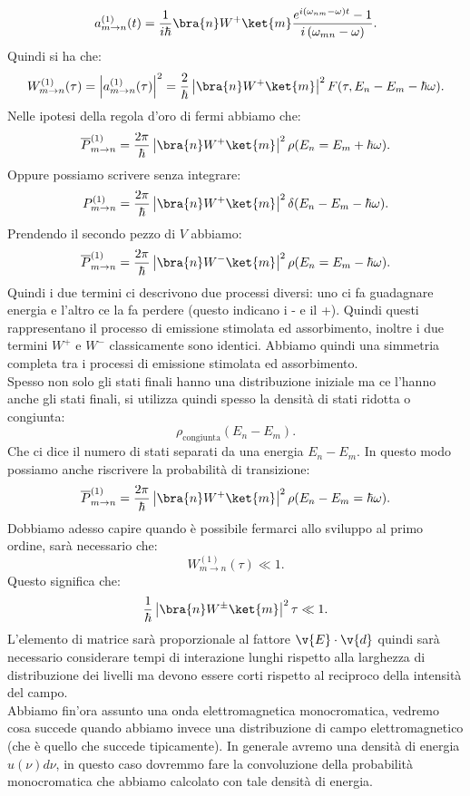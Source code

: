 \[
    a_{m\to n}^{(1)}(t) =
    \frac{1}{i\hbar }\bra{n}W^+ \ket{m} \frac{e^{i(\omega_{nm}-\omega )t}-1}{i\left( \omega_{mn}-\omega\right)}
.\] 
Quindi si ha che:
\[
    W^{(1) }_{m\to n}(\tau) =
    \left|a^{(1)}_{m\to n}(\tau) \right|^2 =
    \frac{2}{\hbar }\left|\bra{n}W^+ \ket{m}\right|^2 F(\tau,E_n-E_m - \hbar \omega) 
.\] 
Nelle ipotesi della regola d'oro di fermi abbiamo che:
\[
    \overline{P}^{(1)}_{m\to n} = \frac{2\pi}{\hbar }\left|\bra{n}W^+ \ket{m}\right|^2\rho(E_n=E_m+\hbar \omega) 
.\] 
Oppure possiamo scrivere senza integrare:
\[
    P^{(1)}_{m\to n} = \frac{2\pi}{\hbar }\left|\bra{n}W^+ \ket{m}\right|^2\delta (E_n-E_m-\hbar \omega) 
.\] 
Prendendo il secondo pezzo di $V$ abbiamo:
\[
    \overline{P}^{(1)}_{m\to n} = \frac{2\pi}{\hbar }\left|\bra{n}W^- \ket{m}\right|^2\rho(E_n=E_m-\hbar \omega) 
.\] 
Quindi i due termini ci descrivono due processi diversi: uno ci fa guadagnare energia e l'altro ce la fa perdere (questo indicano i - e il +). Quindi questi rappresentano il processo di emissione stimolata ed assorbimento, inoltre i due termini $W^+$ e $W^-$ classicamente sono identici. Abbiamo quindi una simmetria completa tra i processi di emissione stimolata ed assorbimento.\\
Spesso non solo gli stati finali hanno una distribuzione iniziale ma ce l'hanno anche gli stati finali, si utilizza quindi spesso la densità di stati ridotta o congiunta:
\[
    \rho_\text{congiunta} (E_n-E_m) 
.\] 
Che ci dice il numero di stati separati da una energia $E_n-E_m$. In questo modo possiamo anche riscrivere la probabilità di transizione:
\[
    \overline{P}^{(1)}_{m\to n} = \frac{2\pi}{\hbar }\left|\bra{n}W^+ \ket{m}\right|^2\rho(E_n-E_m=\hbar \omega) 
.\] 
Dobbiamo adesso capire quando è possibile fermarci allo sviluppo al primo ordine, sarà necessario che:
\[
    W^{(1) }_{m\to n}(\tau) \ll 1
.\] 
Questo significa che:
\[
\frac{1}{\hbar }\left|\bra{n}W^{\pm} \ket{m}\right|^2\tau \ll 1
.\] 
L'elemento di matrice sarà proporzionale al fattore $\v{E}\cdot \v{d}$ quindi sarà necessario considerare tempi di interazione lunghi rispetto alla larghezza di distribuzione dei livelli ma devono essere corti rispetto al reciproco della intensità del campo.\\
Abbiamo fin'ora assunto una onda elettromagnetica monocromatica, vedremo cosa succede quando abbiamo invece una distribuzione di campo elettromagnetico (che è quello che succede tipicamente). In generale avremo una densità di energia $u(\nu)d\nu$, in questo caso dovremmo fare la convoluzione della probabilità monocromatica che abbiamo calcolato con tale densità di energia.\\
